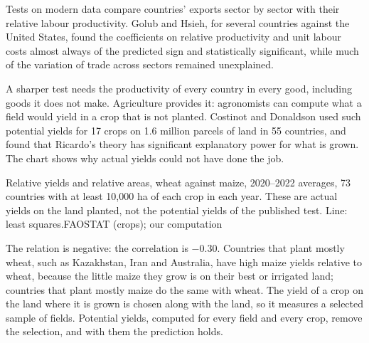 \begin{record}
Tests on modern data compare countries' exports sector by sector with their
relative labour productivity. Golub and Hsieh, for several countries against
the United States, found the coefficients on relative productivity and unit
labour costs almost always of the predicted sign and statistically significant,
while much of the variation of trade across sectors remained unexplained.
\end{record}

A sharper test needs the productivity of every country in every good,
including goods it does not make. Agriculture provides it: agronomists can
compute what a field would yield in a crop that is not planted. Costinot and
Donaldson used such potential yields for 17 crops on 1.6 million parcels of land
in 55 countries, and found that Ricardo's theory has significant explanatory
power for what is grown. %
The chart shows why actual yields could not have done the job.

\begin{omchart}{Relative yields and relative areas, wheat against maize,
2020--2022 averages, 73 countries with at least 10{,}000 ha of each crop in each
year. These are actual yields on the land planted, not the potential yields of
the published test. Line: least squares.}{FAOSTAT (crops); our computation}
\end{omchart}

The relation is negative: the correlation is $-0.30$. %
Countries that plant mostly wheat, such as Kazakhstan, Iran and Australia, have
high maize yields relative to wheat, because the little maize they grow is on
their best or irrigated land; countries that plant mostly maize do the same with
wheat. The yield of a crop on the land where it is grown is chosen along with
the land, so it measures a selected sample of fields. Potential yields, computed
for every field and every crop, remove the selection, and with them the
prediction holds.


